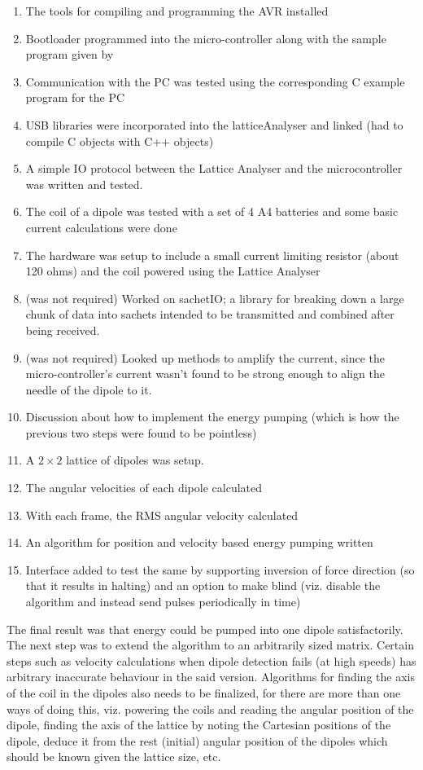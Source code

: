 			\begin{enumerate}
				\item The tools for compiling and programming the AVR installed
				\item Bootloader programmed into the micro-controller along with the sample program given by \myProf
				\item Communication with the PC was tested using the corresponding C example program for the PC
				\item USB libraries were incorporated into the latticeAnalyser and linked (had to compile C objects with C++ objects)
				\item A simple IO protocol between the Lattice Analyser and the microcontroller was written and tested.
				\item The coil of a dipole was tested with a set of 4 A4 batteries and some basic current calculations were done
				\item The hardware was setup to include a small current limiting resistor (about 120 ohms) and the coil powered using the Lattice Analyser
				\item (was not required) Worked on sachetIO; a library for breaking down a large chunk of data into sachets intended to be transmitted and combined after being received.
				\item (was not required) Looked up methods to amplify the current, since the micro-controller's current wasn't found to be strong enough to align the needle of the dipole to it.
				\item Discussion about how to implement the energy pumping (which is how the previous two steps were found to be pointless)
				\item A $2 \times 2$ lattice of dipoles was setup. 
				\item The angular velocities of each dipole calculated
				\item With each frame, the RMS angular velocity calculated
				\item An algorithm for position and velocity based energy pumping written
				\item Interface added to test the same by supporting inversion of force direction (so that it results in halting) and an option to make blind (viz. disable the algorithm and instead send pulses periodically in time)
			\end{enumerate}
			The final result was that energy could be pumped into one dipole satisfactorily. The next step was to extend the algorithm to an arbitrarily sized matrix. Certain steps such as velocity calculations when dipole detection fails (at high speeds) has arbitrary inaccurate behaviour in the said version. Algorithms for finding the axis of the coil in the dipoles also needs to be finalized, for there are more than one ways of doing this, viz. powering the coils and reading the angular position of the dipole, finding the axis of the lattice by noting the Cartesian positions of the dipole, deduce it from the rest (initial) angular position of the dipoles which should be known given the lattice size, etc.				
